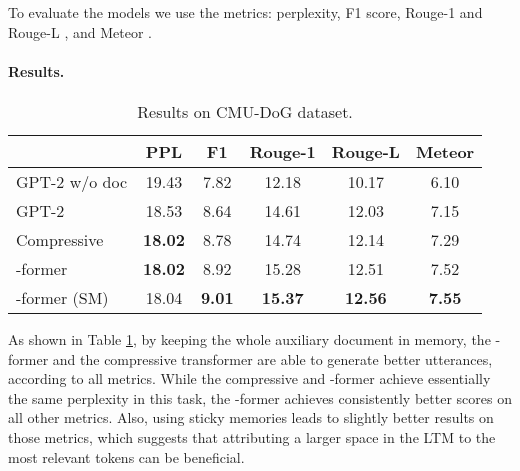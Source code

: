 \documentclass[11pt]{article}
\begin{document}
To evaluate the models we use the metrics: perplexity, F1 score, Rouge-1 and Rouge-L \citep{lin2004rouge}, and Meteor \citep{banerjee2005meteor}.


\paragraph{Results. }
\begin{table}[t]
\centering \small
\setlength{\tabcolsep}{0.7ex}
\begin{tabular}{l@{\hspace{1ex}}c@{\hspace{2ex}}cccc}
\toprule
& PPL & F1 & Rouge-1 & Rouge-L & Meteor \\
\midrule
GPT-2 w/o doc & 19.43 & 7.82 & 12.18 & 10.17 & 6.10    \\
GPT-2 & 18.53 & 8.64 & 14.61 & 12.03 & 7.15  \\
Compressive & \textbf{18.02} & 8.78 & 14.74 & 12.14 & 7.29  \\
-former & \textbf{18.02} & 8.92 & 15.28 & 12.51 & 7.52  \\
-former (SM) & 18.04 & \textbf{9.01} & \textbf{15.37} & \textbf{12.56} & \textbf{7.55} \\
\bottomrule
\end{tabular}
\caption{Results on CMU-DoG dataset.}
\label{table:dgg}
\end{table}

As shown in Table \ref{table:dgg}, by keeping the whole auxiliary document in memory, the \mbox{-former} and the compressive transformer are able to generate better utterances, according to all metrics. 
While the compressive and \mbox{-former} achieve essentially the same perplexity in this task, 
the \mbox{-former} achieves consistently better scores on all other metrics. 
Also, using sticky memories leads to slightly better results on those metrics, which suggests that attributing a larger space in the LTM to the most relevant tokens can be beneficial.
\end{document}

